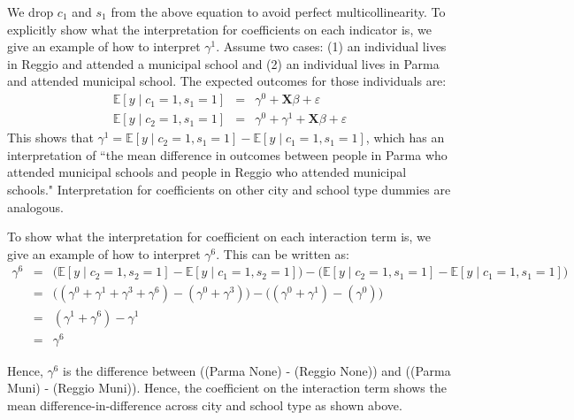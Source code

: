 \documentclass[11pt]{article}
\begin{document}
We drop $c_1$ and $s_1$ from the above equation to avoid perfect multicollinearity. To explicitly show what the interpretation for coefficients on each indicator is, we give an example of how to interpret $\gamma^1$. Assume two cases: (1) an individual lives in Reggio and attended a municipal school and (2) an individual lives in Parma and attended municipal school. The expected outcomes for those individuals are:
\begin{eqnarray*}  
    \mathbb{E}[y \mid c_1 = 1, s_1 = 1] & = & \gamma^0 + \mathbf{X}\beta + \varepsilon \\
    \mathbb{E}[y \mid c_2 = 1, s_1 = 1] & = & \gamma^0 + \gamma^1 + \mathbf{X}\beta + \varepsilon      
\end{eqnarray*}
This shows that $\gamma^1 = \mathbb{E}[y \mid c_2 = 1, s_1 = 1] - \mathbb{E}[y \mid c_1 = 1, s_1 = 1]$, which has an interpretation of ``the mean difference in outcomes between people in Parma who attended municipal schools and people in Reggio who attended municipal schools." Interpretation for coefficients on other city and school type dummies are analogous.

To show what the interpretation for coefficient on each interaction term is, we give an example of how to interpret $\gamma^6$. This can be written as:
\begin{eqnarray*}
\gamma^6 & = & \Big(\mathbb{E}[y \mid c_2 = 1, s_2 = 1] - \mathbb{E}[y \mid c_1 = 1, s_2 = 1] \Big) - \Big(\mathbb{E}[y \mid c_2 = 1, s_1 = 1] - \mathbb{E}[y \mid c_1 = 1, s_1 = 1] \Big) \\
& = & \Big((\gamma^0 + \gamma^1 + \gamma^3 + \gamma^6) - (\gamma^0 + \gamma^3)\Big) - \Big((\gamma^0 + \gamma^1) - (\gamma^0) \Big) \\
& = & (\gamma^1 + \gamma^6) - \gamma^1 \\
& = & \gamma^6
\end{eqnarray*}

Hence, $\gamma^6$ is the difference between \Big((Parma None) - (Reggio None)\Big) and \Big((Parma Muni) - (Reggio Muni)\Big). Hence, the coefficient on the interaction term shows the mean difference-in-difference across city and school type as shown above.   
\end{document}
